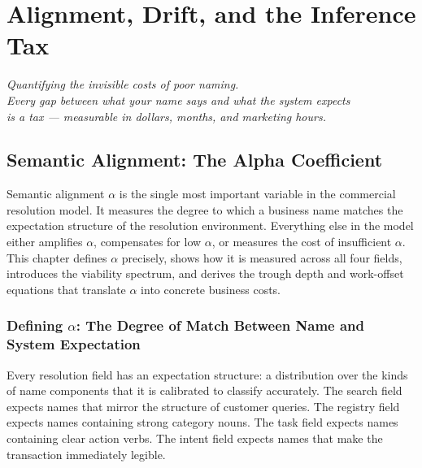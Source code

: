 \documentclass[12pt, openany]{book}
\theoremstyle{thmstyle}
\theoremstyle{defstyle}
\begin{document}
\tableofcontents
\newpage

\part{Alignment, Drift, and the Inference Tax}

\vspace{16pt}
\begin{center}
\color{accentgray}\itshape
Quantifying the invisible costs of poor naming.\\
Every gap between what your name says and what the system expects\\
is a tax --- measurable in dollars, months, and marketing hours.
\end{center}

\chapter{Semantic Alignment: The Alpha Coefficient}

\begin{keybox}
Semantic alignment $\alpha$ is the single most important variable in the commercial resolution model. It measures the degree to which a business name matches the expectation structure of the resolution environment. Everything else in the model either amplifies $\alpha$, compensates for low $\alpha$, or measures the cost of insufficient $\alpha$. This chapter defines $\alpha$ precisely, shows how it is measured across all four fields, introduces the viability spectrum, and derives the trough depth and work-offset equations that translate $\alpha$ into concrete business costs.
\end{keybox}

\section{Defining $\alpha$: The Degree of Match Between Name and System Expectation}

Every resolution field has an expectation structure: a distribution over the kinds of name components that it is calibrated to classify accurately. The search field expects names that mirror the structure of customer queries. The registry field expects names containing strong category nouns. The task field expects names containing clear action verbs. The intent field expects names that make the transaction immediately legible.
\end{document}
